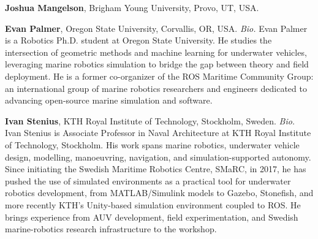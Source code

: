 \documentclass[10pt]{article}
\begin{document}
\textbf{Joshua Mangelson}, Brigham Young University, Provo, UT, USA.

\textbf{Evan Palmer}, Oregon State University, Corvallis, OR, USA.
\emph{Bio.} Evan Palmer is a Robotics Ph.D. student at Oregon State University. He studies the intersection of geometric methods and machine learning for underwater vehicles, leveraging marine robotics simulation to bridge the gap between theory and field deployment. He is a former co-organizer of the ROS Maritime Community Group: an international group of marine robotics researchers and engineers dedicated to advancing open-source marine simulation and software.

\textbf{Ivan Stenius}, KTH Royal Institute of Technology, Stockholm, Sweden.
\emph{Bio.} 
Ivan Stenius is Associate Professor in Naval Architecture at KTH Royal Institute of Technology, Stockholm. His work spans marine robotics, underwater vehicle design, modelling, manoeuvring, navigation, and simulation-supported autonomy. Since initiating the Swedish Maritime Robotics Centre, SMaRC, in 2017, he has pushed the use of simulated environments as a practical tool for underwater robotics development, from MATLAB/Simulink models to Gazebo, Stonefish, and more recently KTH’s Unity-based simulation environment coupled to ROS. He brings experience from AUV development, field experimentation, and Swedish marine-robotics research infrastructure to the workshop.
\end{document}
